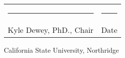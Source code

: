 \documentclass[12pt]{report} %
\begin{document}
        \begin{center}
            \begin{tabular}{p{3in} p{1in}}
                \rule{3in}{0.4pt} & \rule{1in}{0.4pt}\\
                Kyle Dewey, PhD., Chair & Date \\
            \end{tabular}
        \end{center}

        \vspace{\fill}

        \begin{center}
            California State University, Northridge
        \end{center}

    \newpage

    

    \newpage

    \tableofcontents

    \newpage


    
\end{document}
